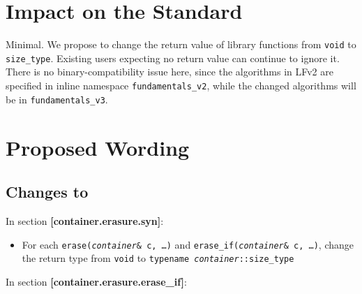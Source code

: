 \documentclass[11pt]{article}
\begin{document}
\section{Impact on the Standard}

Minimal. We propose to change the return value of library functions
from \texttt{void} to \texttt{size\_type}. Existing users expecting no
return value can continue to ignore it. There is no
binary-compatibility issue here, since the algorithms in LFv2 are
specified in inline namespace \texttt{fundamentals\_v2}, while the
changed algorithms will be in \texttt{fundamentals\_v3}.

\section{Proposed Wording}

\subsection{Changes to \cite{LFv3}}

In section \textbf{[container.erasure.syn]}:

\begin{itemize}
\item For each \texttt{erase(\textit{container}\& c, \ldots)} and
  \texttt{erase\_if(\textit{container}\& c, \ldots)}, change the return
  type from \texttt{void} to \texttt{typename \textit{container}::size\_type}
\end{itemize}

In section \textbf{[container.erasure.erase\_if]}:
\end{document}
